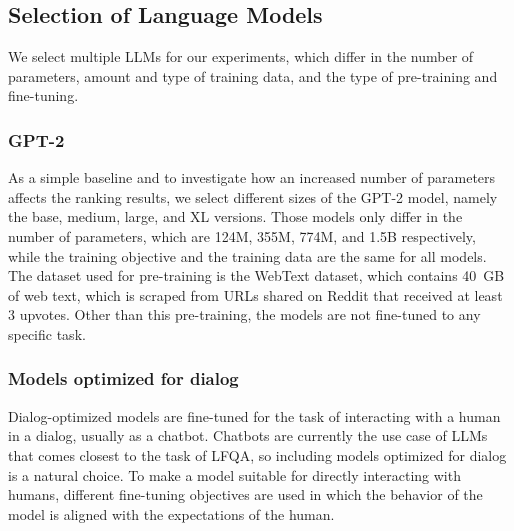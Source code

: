 \subsection{Selection of Language Models}
We select multiple LLMs for our experiments, which differ in the number of parameters, amount and type of training data, and the type of pre-training and fine-tuning.

\subsubsection{GPT-2}
As a simple baseline and to investigate how an increased number of parameters affects the ranking results, we select different sizes of the GPT-2 model, namely the base, medium, large, and XL versions.
Those models only differ in the number of parameters, which are 124M, 355M, 774M, and 1.5B respectively, while the training objective and the training data are the same for all models.
The dataset used for pre-training is the WebText dataset, which contains 40 GB of web text, which is scraped from URLs shared on Reddit that received at least 3 upvotes.
Other than this pre-training, the models are not fine-tuned to any specific task.

\subsubsection{Models optimized for dialog}\label{sec:dialog-models}
Dialog-optimized models are fine-tuned for the task of interacting with a human in a dialog, usually as a chatbot.
Chatbots are currently the use case of LLMs that comes closest to the task of LFQA, so including models optimized for dialog is a natural choice.
To make a model suitable for directly interacting with humans, different fine-tuning objectives are used in which the behavior of the model is aligned with the expectations of the human.

